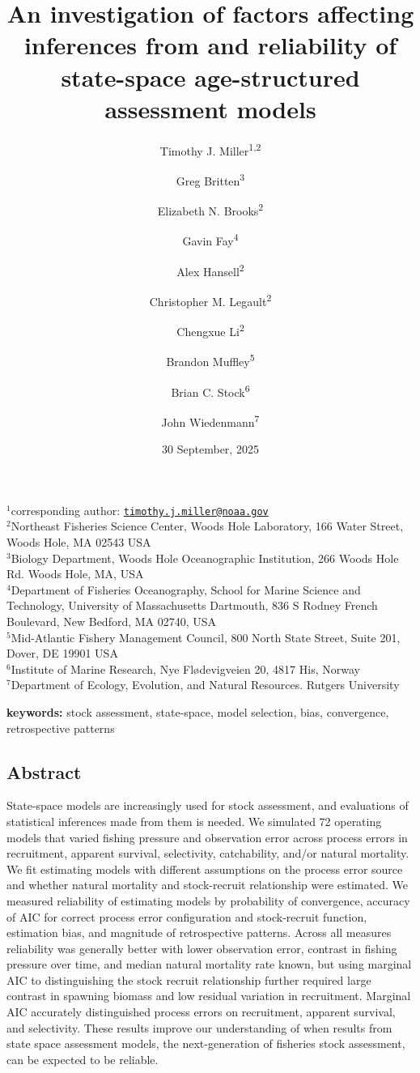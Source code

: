 \documentclass[
  12pt,
]{article}
\title{An investigation of factors affecting inferences from and
reliability of state-space age-structured assessment models}
\author{Timothy J. Miller\textsuperscript{1,2} \and Greg
Britten\textsuperscript{3} \and Elizabeth N.
Brooks\textsuperscript{2} \and Gavin Fay\textsuperscript{4} \and Alex
Hansell\textsuperscript{2} \and Christopher M.
Legault\textsuperscript{2} \and Chengxue
Li\textsuperscript{2} \and Brandon Muffley\textsuperscript{5} \and Brian
C. Stock\textsuperscript{6} \and John Wiedenmann\textsuperscript{7}}
\date{30 September, 2025}
\begin{document}
\maketitle

\(^1\)corresponding author:
\href{mailto:timothy.j.miller@noaa.gov}{\nolinkurl{timothy.j.miller@noaa.gov}}\\
\(^2\)Northeast Fisheries Science Center, Woods Hole Laboratory, 166
Water Street, Woods Hole, MA 02543 USA\\
\(^3\)Biology Department, Woods Hole Oceanographic Institution, 266
Woods Hole Rd. Woods Hole, MA, USA\\
\(^4\)Department of Fisheries Oceanography, School for Marine Science
and Technology, University of Massachusetts Dartmouth, 836 S Rodney
French Boulevard, New Bedford, MA 02740, USA\\
\(^5\)Mid-Atlantic Fishery Management Council, 800 North State Street,
Suite 201, Dover, DE 19901 USA\\
\(^6\)Institute of Marine Research, Nye Flødevigveien 20, 4817 His,
Norway\\
\(^7\)Department of Ecology, Evolution, and Natural Resources. Rutgers
University\\

\pagebreak

\textbf{keywords:} stock assessment, state-space, model selection, bias,
convergence, retrospective patterns

\subsection*{Abstract}\label{abstract}

State-space models are increasingly used for stock assessment, and
evaluations of statistical inferences made from them is needed. We
simulated 72 operating models that varied fishing pressure and
observation error across process errors in recruitment, apparent
survival, selectivity, catchability, and/or natural mortality. We fit
estimating models with different assumptions on the process error source
and whether natural mortality and stock-recruit relationship were
estimated. We measured reliability of estimating models by probability
of convergence, accuracy of AIC for correct process error configuration
and stock-recruit function, estimation bias, and magnitude of
retrospective patterns. Across all measures reliability was generally
better with lower observation error, contrast in fishing pressure over
time, and median natural mortality rate known, but using marginal AIC to
distinguishing the stock recruit relationship further required large
contrast in spawning biomass and low residual variation in recruitment.
Marginal AIC accurately distinguished process errors on recruitment,
apparent survival, and selectivity. These results improve our
understanding of when results from state space assessment models, the
next-generation of fisheries stock assessment, can be expected to be
reliable.
\end{document}
